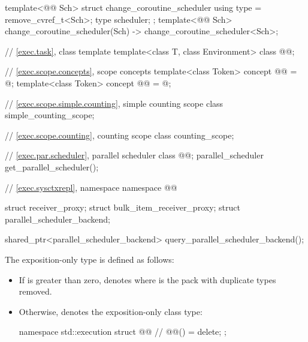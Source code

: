 \begin{codeblock}
{  template<@@ Sch>
  struct change_coroutine_scheduler {
    using type = remove_cvref_t<Sch>;
    type scheduler;
  };
  template<@@ Sch>
    change_coroutine_scheduler(Sch) -> change_coroutine_scheduler<Sch>;

  // \ref{exec.task}, class template 
  template<class T, class Environment>
    class @@;

  // \ref{exec.scope.concepts}, scope concepts
  template<class Token>
    concept @@ = @\seebelow@;
  template<class Token>
    concept @@ = @\seebelow@;

  // \ref{exec.scope.simple.counting}, simple counting scope
  class simple_counting_scope;

  // \ref{exec.scope.counting}, counting scope
  class counting_scope;

  // \ref{exec.par.scheduler}, parallel scheduler
  class @@;
  parallel_scheduler get_parallel_scheduler();

  // \ref{exec.sysctxrepl}, namespace 
  namespace @@ {
    struct receiver_proxy;
    struct bulk_item_receiver_proxy;
    struct parallel_scheduler_backend;

    shared_ptr<parallel_scheduler_backend> query_parallel_scheduler_backend();
  }
}
\end{codeblock}

\pnum
The exposition-only type 
is defined as follows:
\begin{itemize}
\item
If  is greater than zero,
 denotes 
where  is the pack 
with duplicate types removed.
\item
Otherwise,  denotes
the exposition-only class type:
\begin{codeblock}
namespace std::execution {
  struct @@ {        // \expos
    @@() = delete;
  };
}
\end{codeblock}
\end{itemize}


